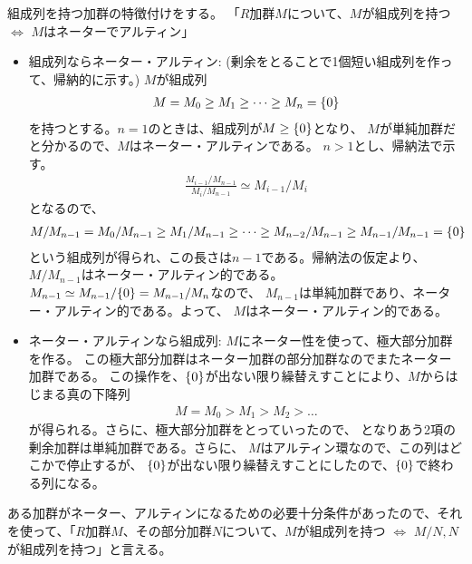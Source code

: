 \documentclass[9pt]{ltjsarticle}
\begin{document}
組成列を持つ加群の特徴付けをする。
「$R$加群$M$について、$M$が組成列を持つ $\iff$ $M$はネーターでアルティン」
\begin{myproof}
  \begin{itemize}
    \item 組成列ならネーター・アルティン:
    (剰余をとることで1個短い組成列を作って、帰納的に示す。)
    $M$が組成列
    \begin{align}
      M = M_0 \ge M_1 \ge \dots \ge M_n = \{0\}
    \end{align}
    を持つとする。$n=1$のときは、組成列が$M\ge \{0\}$となり、
    $M$が単純加群だと分かるので、$M$はネーター・アルティンである。
    $n>1$とし、帰納法で示す。
    \begin{align}
      \frac{M_{i-1}/M_{n-1}}{M_i/M_{n-1}} \simeq M_{i-1}/M_i
    \end{align}
    となるので、
    \begin{align}
      M/M_{n-1} = M_{0}/M_{n-1} \ge M_1/M_{n-1} \ge \dots
      \ge M_{n-2}/M_{n-1} \ge M_{n-1}/M_{n-1} = \{0\}
    \end{align}
    という組成列が得られ、この長さは$n-1$である。帰納法の仮定より、
    $M/M_{n-1}$はネーター・アルティン的である。
    $M_{n-1} \simeq M_{n-1}/\{0\} = M_{n-1}/M_n$なので、
    $M_{n-1}$は単純加群であり、ネーター・アルティン的である。よって、
    $M$はネーター・アルティン的である。
    \item ネーター・アルティンなら組成列:
    $M$にネーター性を使って、極大部分加群を作る。
    この極大部分加群はネーター加群の部分加群なのでまたネーター加群である。
    この操作を、$\{0\}$が出ない限り繰替えすことにより、$M$からはじまる真の下降列
    \begin{align}
      M = M_0 > M_1 > M_2 > \dots
    \end{align}
    が得られる。さらに、極大部分加群をとっていったので、
    となりあう2項の剰余加群は単純加群である。さらに、
    $M$はアルティン環なので、この列はどこかで停止するが、
    $\{0\}$が出ない限り繰替えすことにしたので、$\{0\}$で終わる列になる。
  \end{itemize}
\end{myproof}

ある加群がネーター、アルティンになるための必要十分条件があったので、それを使って、「$R$加群$M$、その部分加群$N$について、$M$が組成列を持つ $\iff$ $M/N,N$が組成列を持つ」と言える。
\end{document}
